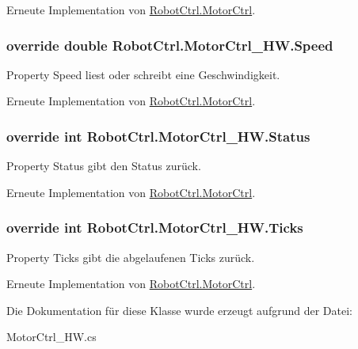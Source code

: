 Erneute Implementation von \hyperlink{class_robot_ctrl_1_1_motor_ctrl_a1152904081a4c96fa0bf27a6a48e728d}{RobotCtrl.MotorCtrl}.

\hypertarget{class_robot_ctrl_1_1_motor_ctrl___h_w_a037b7d7d65571c8eda634bef767a1870}{
\subsubsection[{Speed}]{\setlength{\rightskip}{0pt plus 5cm}override double RobotCtrl.MotorCtrl\_\-HW.Speed}}
\label{class_robot_ctrl_1_1_motor_ctrl___h_w_a037b7d7d65571c8eda634bef767a1870}
Property Speed liest oder schreibt eine Geschwindigkeit. 

Erneute Implementation von \hyperlink{class_robot_ctrl_1_1_motor_ctrl_a13a5a1ee7896d0557c58ba617af60029}{RobotCtrl.MotorCtrl}.

\hypertarget{class_robot_ctrl_1_1_motor_ctrl___h_w_a0c39f88363e68b382cf946f37fe98e16}{
\subsubsection[{Status}]{\setlength{\rightskip}{0pt plus 5cm}override int RobotCtrl.MotorCtrl\_\-HW.Status}}
\label{class_robot_ctrl_1_1_motor_ctrl___h_w_a0c39f88363e68b382cf946f37fe98e16}
Property Status gibt den Status zur\"{u}ck. 

Erneute Implementation von \hyperlink{class_robot_ctrl_1_1_motor_ctrl_ac0f2ebafce89738ca669eaa920a30c80}{RobotCtrl.MotorCtrl}.

\hypertarget{class_robot_ctrl_1_1_motor_ctrl___h_w_a22603ba1614f7f9eb88f2b7ea0a4c700}{
\subsubsection[{Ticks}]{\setlength{\rightskip}{0pt plus 5cm}override int RobotCtrl.MotorCtrl\_\-HW.Ticks}}
\label{class_robot_ctrl_1_1_motor_ctrl___h_w_a22603ba1614f7f9eb88f2b7ea0a4c700}
Property Ticks gibt die abgelaufenen Ticks zur\"{u}ck. 

Erneute Implementation von \hyperlink{class_robot_ctrl_1_1_motor_ctrl_a625a8335b71115e58d2d04c59027fb81}{RobotCtrl.MotorCtrl}.



Die Dokumentation für diese Klasse wurde erzeugt aufgrund der Datei:\begin{DoxyCompactItemize}
\item 
MotorCtrl\_\-HW.cs\end{DoxyCompactItemize}
